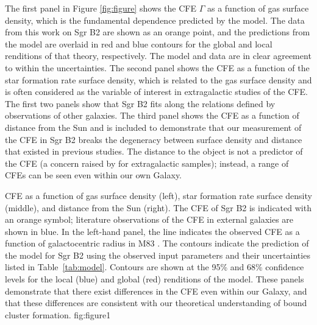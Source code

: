 \documentclass[twocolumn]{aastex62}
\begin{document}
The first panel in Figure \ref{fig:figure} shows the CFE $\Gamma$ as a function
of gas surface density, which is the fundamental dependence predicted by the
model. The data from this work on Sgr B2 are shown as an orange point, and the
predictions from the \citet{Kruijssen2012a} model are overlaid in red and blue
contours for the global and local renditions of that theory, respectively. The
model and data are in clear agreement to within the uncertainties. The second
panel shows the CFE as a function of the star formation rate surface density,
which is related to the gas surface density
\citep[e.g.,][]{Kennicutt1998a,Bigiel2008a,Leroy2013a} and is often considered
as the variable of interest in extragalactic studies of the CFE. The first two
panels show that Sgr B2 fits along the relations defined by observations of
other galaxies. The third panel shows the CFE as a function of distance from
the Sun and is included to demonstrate that our measurement of the CFE in Sgr
B2 breaks the degeneracy between surface density and distance that existed in
previous studies. The distance to the object is not a predictor of the CFE (a
concern raised by \citealt{Adamo2011a} for extragalactic samples); instead, a
range of CFEs can be seen even within our own Galaxy.

{CFE as a function of gas surface density (left), star formation rate surface
density (middle), and distance from the Sun (right). The CFE of Sgr B2 is
indicated with an orange symbol; literature observations of the CFE in
external galaxies are shown in blue. In the left-hand panel, the line indicates
the observed CFE as a function of galactocentric radius in M83
\citep{Adamo2015a}. The contours indicate the prediction of the
\citet{Kruijssen2012a} model for Sgr B2 using the observed input parameters and
their uncertainties listed in Table~\ref{tab:model}. Contours are shown at the
95\% and 68\% confidence levels for the local (blue) and global (red)
renditions of the model. These panels demonstrate that there exist differences
in the CFE even within our Galaxy, and that these differences are consistent
with our theoretical understanding of bound cluster formation. 
}
{fig:figure}{1}{\textwidth}
\end{document}
